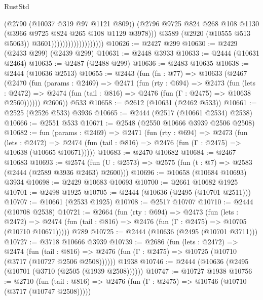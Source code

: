 \begin{lexlean}{RustStd}
\begin{coremodule}
                                            (@2790 (@10037 @319 @97 @1121 @809))
                                            (@2796
                                              @9725
                                              @824
                                              @268
                                              @108
                                              @1130
                                              (@3966 @9725 @824 @265 @108 @1129 @3978)))
                                          @3589
                                          (@2920 (@10555 @513 @5063))
                                          @3601)))))))))))))))))))
@10626 := @2427 @299
@10630 := @2429 (@2433 @299) (@2439 @299)
@10631 := @2448 @3933
@10633 := @2444 (@10631 @2464)
@10635 := @2487 (@2488 @299)
@10636 := @2483 @10635
@10638 := @2444 (@10636 @2513)
@10655 := @2443
    (fun (fn : @77) =>
    @10633
      (@2467
        (@2470
          (fun (params : @2469) =>
          @2471
            (fun (rty : @694) =>
            @2473
              (fun (lets : @2472) =>
              @2474 (fun (tail : @816) => @2476 (fun (Γ : @2475) => @10638 @2560))))))
        @2606))
    @533
@10658 := @2612 (@10631 (@2462 @533))
@10661 := @2525 (@2526 @533) @3936
@10665 := @2444 (@2517 (@10661 @2534) @2538)
@10666 := @2551 @533
@10671 := @2548 (@2550 @10666 @3939 @2506 @2508)
@10682 := fun (params : @2469) =>
  @2471
    (fun (rty : @694) =>
    @2473
      (fun (lets : @2472) =>
      @2474 (fun (tail : @816) => @2476 (fun (Γ : @2475) => @10638 (@10665 @10671)))))
@10683 := @2470 @10682
@10684 := @2467 @10683
@10693 := @2574 (fun (U : @2573) => @2575 (fun (t : @7) => @2583 (@2444 (@2589 @3936 @2463) @2600)))
@10696 := @10658 (@10684 @10693) @3934
@10698 := @2429 @10683 @10693
@10700 := @2661 @10682 @1925
@10701 := @2498 @1925
@10705 := @2444 (@10636 (@2495 (@10701 @2511)))
@10707 := @10661 (@2533 @1925)
@10708 := @2517 @10707
@10710 := @2444 (@10708 @2538)
@10721 := @2664
    (fun (rty : @694) =>
    @2473
      (fun (lets : @2472) =>
      @2474 (fun (tail : @816) => @2476 (fun (Γ : @2475) => @10705 (@10710 @10671)))))
    @789
@10725 := @2444 (@10636 (@2495 (@10701 @3711)))
@10727 := @3718 @10666 @3939
@10739 := @2686
    (fun (lets : @2472) =>
    @2474
      (fun (tail : @816) =>
      @2476 (fun (Γ : @2475) => @10725 (@10710 (@3717 (@10727 @2506 @2508))))))
    @1938
@10746 := @2444 (@10636 (@2495 (@10701 (@3710 (@2505 (@1939 @2508))))))
@10747 := @10727 @1938
@10756 := @2710
    (fun (tail : @816) => @2476 (fun (Γ : @2475) => @10746 (@10710 (@3717 (@10747 @2508)))))

\end{coremodule}
\end{lexlean}
